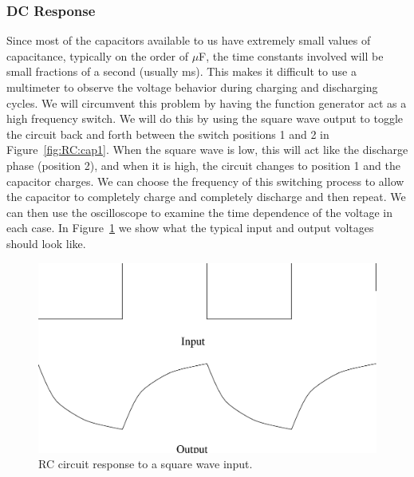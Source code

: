 \subsubsection{DC Response}

Since most of the capacitors available to us have extremely small values of 
capacitance, typically on the order of $\mu$F, the time constants involved will
be small fractions of a second (usually ms). This makes it difficult to use a
multimeter to observe the voltage behavior during charging and discharging 
cycles. We will circumvent this problem by having the function generator act
as a high frequency switch. We will do this by using the square wave output to
toggle the circuit back and forth between the switch positions 1 and 2 in 
Figure~\ref{fig:RC:cap1}. When the square wave is low, this will act like the 
discharge phase (position 2), and when it is high, the circuit changes to 
position 1 and the capacitor charges. We can choose the frequency of this 
switching process to allow the capacitor to completely charge and completely 
discharge and then repeat. We can then use the oscilloscope to examine the time
dependence of the voltage in each case. In Figure~\ref{fig:RC:onoff} we show 
what the typical input and output voltages should look like. \\
\begin{figure}[htb]
\centering 
\epsfxsize=10cm \includegraphics[scale=0.5]{5_rccircuits/squareout.eps}
\caption{RC circuit response to a square wave input.}
\label{fig:RC:onoff}
\end{figure}

